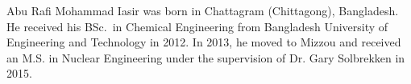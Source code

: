 \documentclass[hyper,dissertation]{MUthesis}
\begin{document}
\tableofcontents
\listoftables

\listoffigures
\printnomenclature[0.8in]






\mainmatter %


















\appendix

%


%



\backmatter %


%

\begin{vita}
Abu Rafi Mohammad Iasir was born in Chattagram (Chittagong), Bangladesh. He received his BSc.\ in Chemical Engineering from Bangladesh University of Engineering and Technology in 2012. In 2013, he moved to Mizzou and received an M.S. in Nuclear Engineering under the supervision of Dr. Gary Solbrekken in 2015. 
\end{vita}
\end{document}
